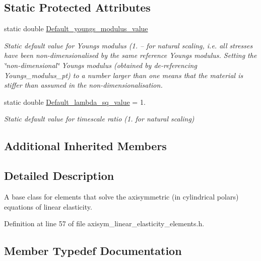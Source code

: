 \subsection*{Static Protected Attributes}
\begin{DoxyCompactItemize}
\item 
static double \hyperlink{classoomph_1_1AxisymmetricLinearElasticityEquationsBase_ab805f3d2d1a92be924b68367c6f002dd}{Default\+\_\+youngs\+\_\+modulus\+\_\+value}
\begin{DoxyCompactList}\small\item\em Static default value for Young\textquotesingle{}s modulus (1. -- for natural scaling, i.\+e. all stresses have been non-\/dimensionalised by the same reference Young\textquotesingle{}s modulus. Setting the \char`\"{}non-\/dimensional\char`\"{} Young\textquotesingle{}s modulus (obtained by de-\/referencing Youngs\+\_\+modulus\+\_\+pt) to a number larger than one means that the material is stiffer than assumed in the non-\/dimensionalisation. \end{DoxyCompactList}\item 
static double \hyperlink{classoomph_1_1AxisymmetricLinearElasticityEquationsBase_a9788b32107b4eacd99bdffe73e83245a}{Default\+\_\+lambda\+\_\+sq\+\_\+value} = 1.
\begin{DoxyCompactList}\small\item\em Static default value for timescale ratio (1. for natural scaling) \end{DoxyCompactList}\end{DoxyCompactItemize}
\subsection*{Additional Inherited Members}


\subsection{Detailed Description}
A base class for elements that solve the axisymmetric (in cylindrical polars) equations of linear elasticity. 

Definition at line 57 of file axisym\+\_\+linear\+\_\+elasticity\+\_\+elements.\+h.



\subsection{Member Typedef Documentation}
\mbox{\label{classoomph_1_1AxisymmetricLinearElasticityEquationsBase_afa35b69a888eecae4b5f199a1adf88c5}} 
